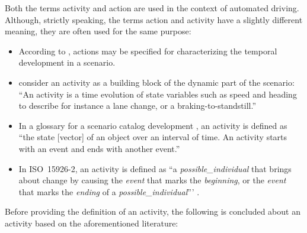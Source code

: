Both the terms activity \autocite{geyer2014, elrofai2018scenario, childress2015using, catapult2018musicc, sigsim2019glossary} and action \autocite{geyer2014, ulbrich2015, bagschik2017ontology} are used in the context of automated driving. Although, strictly speaking, the terms action and activity have a slightly different meaning, they are often used for the same purpose:
\begin{itemize}
	\item According to \textcite{ulbrich2015}, actions may be specified for characterizing the temporal development in a scenario.
	\item \textcite{elrofai2018scenario} consider an activity as a building block of the dynamic part of the scenario: ``An activity is a time evolution of state variables such as speed and heading to describe for instance a lane change, or a braking-to-standstill.''
	\item In a glossary for a scenario catalog development \autocite{catapult2018musicc}, an activity is defined as ``the state [vector] of an object over an interval of time. An activity starts with an event and ends with another event.''
	\item \cstarte In ISO~15926-2, an activity is defined as ``a \textit{possible\_individual} that brings about change by causing the \textit{event} that marks the \textit{beginning}, or the \textit{event} that marks the \textit{ending} of a \textit{possible\_individual}''' \autocite{batres2007upper}. \cende
\end{itemize}


Before providing the definition of an activity, the following is concluded about an activity based on the aforementioned literature:

